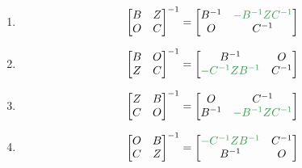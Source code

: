 \documentclass[./linear_algebra.tex]{subfiles}
\begin{document}
\begin{enumerate}
        \begin{enumerate}
            \item
            \[
                \begin{bmatrix}
                    B & Z \\
                    O & C
                \end{bmatrix}^{-1}
                = \begin{bmatrix}
                      B^{-1} & \color[rgb]{0.2, 0.6, 0.3}{-B^{-1}ZC^{-1}} \\
                      O      & C^{-1}
                \end{bmatrix}
            \]
            \item
            \[
                \begin{bmatrix}
                    B & O \\
                    Z & C
                \end{bmatrix}^{-1}
                = \begin{bmatrix}
                      B^{-1}                                     & O      \\
                      \color[rgb]{0.2, 0.6, 0.3}{-C^{-1}ZB^{-1}} & C^{-1}
                \end{bmatrix}
            \]
            \item
            \[
                \begin{bmatrix}
                    Z & B \\
                    C & O
                \end{bmatrix}^{-1}
                = \begin{bmatrix}
                      O      & C^{-1}                                     \\
                      B^{-1} & \color[rgb]{0.2, 0.6, 0.3}{-B^{-1}ZC^{-1}}
                \end{bmatrix}
            \]
            \item
            \[
                \begin{bmatrix}
                    O & B \\
                    C & Z
                \end{bmatrix}^{-1}
                = \begin{bmatrix}
                      \color[rgb]{0.2, 0.6, 0.3}{-C^{-1}ZB^{-1}} & C^{-1} \\
                      B^{-1}                                     & O

\end{bmatrix}\]
\end{enumerate}
\end{enumerate}
\end{document}
